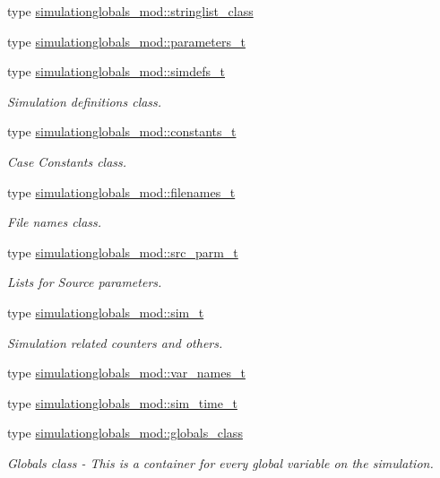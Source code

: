 \begin{DoxyCompactItemize}
\item 
type \mbox{\hyperlink{structsimulationglobals__mod_1_1stringlist__class}{simulationglobals\+\_\+mod\+::stringlist\+\_\+class}}
\item 
type \mbox{\hyperlink{structsimulationglobals__mod_1_1parameters__t}{simulationglobals\+\_\+mod\+::parameters\+\_\+t}}
\item 
type \mbox{\hyperlink{structsimulationglobals__mod_1_1simdefs__t}{simulationglobals\+\_\+mod\+::simdefs\+\_\+t}}
\begin{DoxyCompactList}\small\item\em Simulation definitions class. \end{DoxyCompactList}\item 
type \mbox{\hyperlink{structsimulationglobals__mod_1_1constants__t}{simulationglobals\+\_\+mod\+::constants\+\_\+t}}
\begin{DoxyCompactList}\small\item\em Case Constants class. \end{DoxyCompactList}\item 
type \mbox{\hyperlink{structsimulationglobals__mod_1_1filenames__t}{simulationglobals\+\_\+mod\+::filenames\+\_\+t}}
\begin{DoxyCompactList}\small\item\em File names class. \end{DoxyCompactList}\item 
type \mbox{\hyperlink{structsimulationglobals__mod_1_1src__parm__t}{simulationglobals\+\_\+mod\+::src\+\_\+parm\+\_\+t}}
\begin{DoxyCompactList}\small\item\em Lists for Source parameters. \end{DoxyCompactList}\item 
type \mbox{\hyperlink{structsimulationglobals__mod_1_1sim__t}{simulationglobals\+\_\+mod\+::sim\+\_\+t}}
\begin{DoxyCompactList}\small\item\em Simulation related counters and others. \end{DoxyCompactList}\item 
type \mbox{\hyperlink{structsimulationglobals__mod_1_1var__names__t}{simulationglobals\+\_\+mod\+::var\+\_\+names\+\_\+t}}
\item 
type \mbox{\hyperlink{structsimulationglobals__mod_1_1sim__time__t}{simulationglobals\+\_\+mod\+::sim\+\_\+time\+\_\+t}}
\item 
type \mbox{\hyperlink{structsimulationglobals__mod_1_1globals__class}{simulationglobals\+\_\+mod\+::globals\+\_\+class}}
\begin{DoxyCompactList}\small\item\em Globals class -\/ This is a container for every global variable on the simulation. \end{DoxyCompactList}\end{DoxyCompactItemize}
